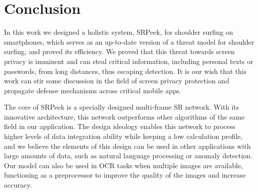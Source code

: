 \section{Conclusion}
\label{sec-conclusion}
In this work we designed a holistic system, \textsf{SRPeek}, for shoulder surfing on smartphones, which serves as an up-to-date version of a threat model for shoulder surfing, and proved its efficiency. We proved that this threat towards screen privacy is imminent and can steal critical information, including personal texts or passwords, from long distances, thus escaping detection. It is our wish that this work can stir some discussion in the field of screen privacy protection and propagate defense mechanisms across critical mobile apps.

The core of SRPeek is a specially designed multi-frame SR network. With its innovative architecture, this network outperforms other algorithms of the same field in our application. The design ideology enables this network to process higher levels of data integration ability while keeping a low calculation profile, and we believe the elements of this design can be used in other applications with large amounts of data, such as natural language processing or anomaly detection. Our model can also be used in OCR tasks when multiple images are available, functioning as a preprocessor to improve the quality of the images and increase accuracy.

